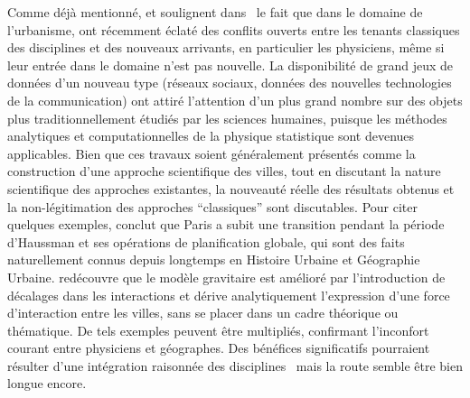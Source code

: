 {Comme déjà mentionné,  et  soulignent dans~\cite{dupuy2015sciences} le fait que dans le domaine de l'urbanisme, ont récemment éclaté des conflits ouverts entre les tenants classiques des disciplines et des nouveaux arrivants, en particulier les physiciens, même si leur entrée dans le domaine n'est pas nouvelle. La disponibilité de grand jeux de données d'un nouveau type (réseaux sociaux, données des nouvelles technologies de la communication) ont attiré l'attention d'un plus grand nombre sur des objets plus traditionnellement étudiés par les sciences humaines, puisque les méthodes analytiques et computationnelles de la physique statistique sont devenues applicables. Bien que ces travaux soient généralement présentés comme la construction d'une approche scientifique des villes, tout en discutant la nature scientifique des approches existantes, la nouveauté réelle des résultats obtenus et la non-légitimation des approches ``classiques'' sont discutables. Pour citer quelques exemples, \cite{barthelemy2013self} conclut que Paris a subit une transition pendant la période d'Haussman et ses opérations de planification globale, qui sont des faits naturellement connus depuis longtemps en Histoire Urbaine et Géographie Urbaine. \cite{chen2009urban} redécouvre que le modèle gravitaire est amélioré par l'introduction de décalages dans les interactions et dérive analytiquement l'expression d'une force d'interaction entre les villes, sans se placer dans un cadre théorique ou thématique. De tels exemples peuvent être multipliés, confirmant l'inconfort courant entre physiciens et géographes. Des bénéfices significatifs pourraient résulter d'une intégration raisonnée des disciplines~\cite{o2015physicists} mais la route semble être bien longue encore.
}




